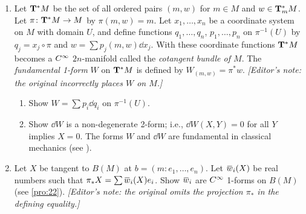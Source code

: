\documentclass[../main]{subfiles}
\begin{document}
\begin{enumerate}
    \item\label{pro:40} Let $\cotangentbundle{M}$ be the set of all ordered pairs $(m,w)$ for $m \in M$ and $w \in \cotangentspace{M}{m}$. Let $\pi\colon \cotangentbundle{M}\functionMaps M$ by $\pi(m, w) = m$. Let $x_1,\dots,x_n$ be a coordinate system on $M$ with domain $U$, and define functions $q_1,\dots,q_n$, $p_1,\dots,p_n$ on $\pi^{-1}(U)$ by $q_j = x_j \circ \pi$ and $w = \sum p_j(m, w)\dd x_j$. With these coordinate functions $\cotangentbundle{M}$ becomes a $\CInfty$ $2n$-manifold called the \emph{cotangent bundle of $M$}. The \emph{fundamental 1-form} $W$ on $\cotangentbundle{M}$ is defined by $W_{(m,w)} = \pi^*w$. \emph{[Editor's note: the original incorrectly places $W$ on $M$.]}
    \begin{enumerate}
        \item Show $W = \sum p_i\dd q_i$ on $\pi^{-1}(U)$.
        \item Show $\dd W$ is a non-degenerate 2-form; i.e., $\dd W(X,Y) = 0$ for all $Y$ implies $X = 0$. The forms $W$ and $\dd W$ are fundamental in classical mechanics (see \cite{mackey2004mathematical}).
    \end{enumerate}
     
    
    \item\label{pro:41} Let $X$ be tangent to $B(M)$ at $b = (m\colon e_1,\dots,e_n)$. Let $\xoverline w_i(X)$ be real numbers such that $\pi_*X = \sum \xoverline w_i(X)e_i$. Show $\xoverline w_i$ are $\CInfty$ 1-forms on $B(M)$ (see \ref{pro:22}). \emph{[Editor's note: the original omits the projection $\pi_*$ in the defining equality.]}
\end{enumerate}
\end{document}
